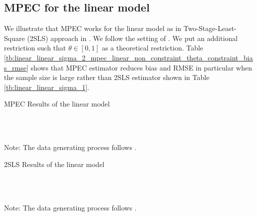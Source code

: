 \documentclass[11pt, a4paper]{article}
\begin{document}
\subsection{MPEC for the linear model}

We illustrate that MPEC works for the linear model as in Two-Stage-Least-Square (2SLS) approach in \cite{matsumura2023resolving}. 
We follow the setting of \cite{matsumura2023resolving}.
We put an additional restriction such that $\theta\in[0,1]$ as a theoretical restriction. 
Table \ref{tb:linear_linear_sigma_2_mpec_linear_non_constraint_theta_constraint_bias_rmse} shows that MPEC estimator reduces bias and RMSE in particular when the sample size is large rather than 2SLS estimator shown in Table \ref{tb:linear_linear_sigma_1}.

\begin{table}[!htbp]
  \begin{center}
      \caption{MPEC Results of the linear model}
      \label{tb:linear_linear_sigma_2_mpec_linear_non_constraint_theta_constraint_bias_rmse} 
      \subfloat[$\sigma=0.5$]{}\\
      \subfloat[$\sigma=1.0$]{}\\
    \subfloat[$\sigma=2.0$]{}
  \end{center}
  \footnotesize
  Note: The data generating process follows \cite{matsumura2023resolving}.
\end{table} 


\begin{table}[!htbp]
  \begin{center}
      \caption{2SLS Results of the linear model}
      \label{tb:linear_linear_sigma_1} 
      \subfloat[$\sigma=0.5$]{}\\
      \subfloat[$\sigma=1.0$]{}\\
    \subfloat[$\sigma=2.0$]{}
  \end{center}
  \footnotesize
  Note: The data generating process follows \cite{matsumura2023resolving}.
\end{table} 
\end{document}
